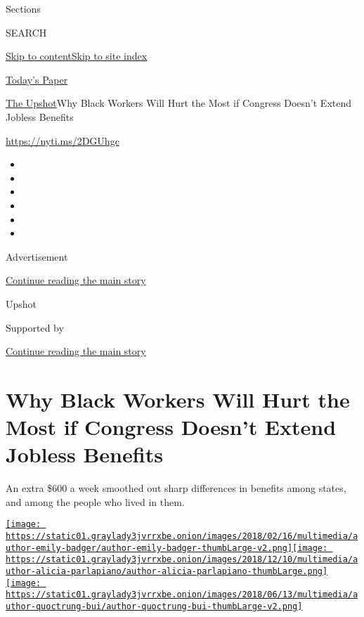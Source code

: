 Sections

SEARCH

\protect\hyperlink{site-content}{Skip to
content}\protect\hyperlink{site-index}{Skip to site index}

\href{https://myaccount.nytimes3xbfgragh.onion/auth/login?response_type=cookie\&client_id=vi}{}

\href{https://www.nytimes3xbfgragh.onion/section/todayspaper}{Today's
Paper}

\href{/section/upshot}{The Upshot}\textbar{}Why Black Workers Will Hurt
the Most if Congress Doesn't Extend Jobless Benefits

\url{https://nyti.ms/2DGUhgc}

\begin{itemize}
\item
\item
\item
\item
\item
\item
\end{itemize}

Advertisement

\protect\hyperlink{after-top}{Continue reading the main story}

Upshot

Supported by

\protect\hyperlink{after-sponsor}{Continue reading the main story}

\hypertarget{why-black-workers-will-hurt-the-most-if-congress-doesnt-extend-jobless-benefits}{%
\section{Why Black Workers Will Hurt the Most if Congress Doesn't Extend
Jobless
Benefits}\label{why-black-workers-will-hurt-the-most-if-congress-doesnt-extend-jobless-benefits}}

An extra \$600 a week smoothed out sharp differences in benefits among
states, and among the people who lived in them.

\href{https://www.nytimes3xbfgragh.onion/by/emily-badger}{\texttt{[image: https://static01.graylady3jvrrxbe.onion/images/2018/02/16/multimedia/author-emily-badger/author-emily-badger-thumbLarge-v2.png]}}\href{https://www.nytimes3xbfgragh.onion/by/alicia-parlapiano}{\texttt{[image: https://static01.graylady3jvrrxbe.onion/images/2018/12/10/multimedia/author-alicia-parlapiano/author-alicia-parlapiano-thumbLarge.png]}}\href{https://www.nytimes3xbfgragh.onion/by/quoctrung-bui}{\texttt{[image: https://static01.graylady3jvrrxbe.onion/images/2018/06/13/multimedia/author-quoctrung-bui/author-quoctrung-bui-thumbLarge-v2.png]}}

